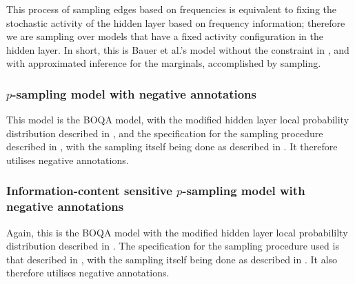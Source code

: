 This process of sampling edges based on frequencies is equivalent to
fixing the stochastic activity of the hidden layer based on
frequency information;
%
therefore we are sampling over models that have a fixed activity configuration in the
hidden layer.
%
In short, this is Bauer et al.'s model without the constraint in
, and with approximated inference for the
marginals, accomplished by sampling.

\subsubsection{$p$-sampling model with negative annotations}
\label{subsubsec:psampexp}
%
This model is the BOQA model, with the modified hidden layer local probability
distribution described in , and the specification for the
sampling procedure described in ,
with the sampling itself being done as described in .
%
It therefore utilises negative annotations.

\subsubsection{Information-content sensitive $p$-sampling model with negative
annotations}
\label{subsubsec:icpsampexp}
%
Again, this is the BOQA model with the modified hidden layer local probabililty
distribution described in . The specification for the sampling
procedure used is that described in ,
with the sampling itself being done as described in .
%
It also therefore utilises negative annotations.
